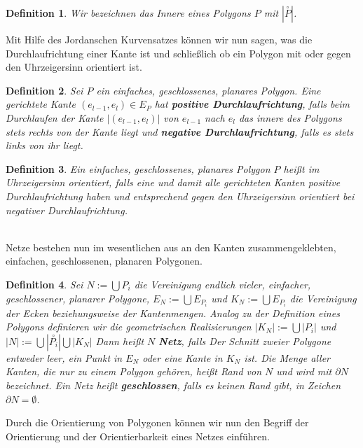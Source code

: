 \documentclass[]{article}
\newtheorem{Definition}{Definition}
\begin{document}
\begin{Definition}
Wir bezeichnen das Innere eines Polygons $P$ mit $|\overset{\circ}{P}|$.
\end{Definition}

Mit Hilfe des Jordanschen Kurvensatzes können wir nun sagen, was die Durchlaufrichtung einer Kante ist und schließlich ob ein Polygon mit oder gegen den Uhrzeigersinn orientiert ist.

\begin{Definition}
Sei $P$ ein einfaches, geschlossenes, planares Polygon. Eine gerichtete Kante $(e_{l-1}, e_l) \in E_P$ hat \textbf{positive Durchlaufrichtung}, falls beim Durchlaufen der  Kante $|(e_{l-1}, e_l)|$ von $e_{l-1}$ nach $e_l$ das innere des Polygons stets rechts von der Kante liegt und \textbf{negative Durchlaufrichtung}, falls es stets links von ihr liegt. 
\end{Definition} 
 
\begin{Definition}
Ein einfaches, geschlossenes, planares Polygon $P$ heißt im Uhrzeigersinn orientiert, falls eine und damit alle gerichteten Kanten positive Durchlaufrichtung haben und entsprechend gegen den Uhrzeigersinn orientiert bei negativer Durchlaufrichtung.  
\end{Definition} 

  \\
 

Netze bestehen nun im wesentlichen aus an den Kanten zusammengeklebten, einfachen, geschlossenen, planaren Polygonen.

\begin{Definition}
Sei $N:= \bigcup P_i$ die Vereinigung endlich vieler, einfacher, geschlossener, planarer Polygone, 
$E_N := \bigcup E_{P_i}$ und $K_N := \bigcup E_{P_i}$ die Vereinigung der Ecken beziehungsweise der Kantenmengen.
Analog zu der Definition eines Polygons definieren wir die geometrischen Realisierungen 
$|K_N| := \bigcup |P_i|$ und $|N| := \bigcup |\overset{\circ}{P_i}| \bigcup |K_N|$
Dann heißt $N$ \textbf{Netz}, falls Der Schnitt zweier Polygone entweder leer, ein Punkt in $E_N$ oder eine Kante in $K_N$ ist. Die Menge aller Kanten, die nur zu einem Polygon gehören, heißt Rand von $N$ und wird mit $\partial N$ bezeichnet.
Ein Netz heißt \textbf{geschlossen}, falls es keinen Rand gibt, in Zeichen $\partial N = \emptyset$. 
\end{Definition} 

Durch die  Orientierung von Polygonen können wir nun den Begriff der Orientierung und der Orientierbarkeit eines Netzes einführen.
\end{document}
